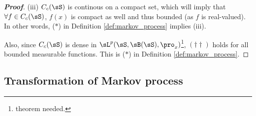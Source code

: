 \begin{proof}[\bf Proof]
\item [(iii)] $C_c(\sS)$ is continous on a compact set, which will imply that $\forall f\in C_c(\sS)$, $f(x)$ is compact as well and thus bounded (as $f$ is real-valued). In other words, ($*$) in Definition \ref{def:markov_process} implies (iii).%

Also, since $C_c(\sS)$ is dense in $\sL^p(\sS,\sB(\sS),\pro_x)$\footnote{theorem needed.}, $(\dag\dag)$ holds for all bounded measurable functions. This is ($*$) in Definition \ref{def:markov_process}.
\een
\end{proof}









\subsection{Transformation of Markov process}

